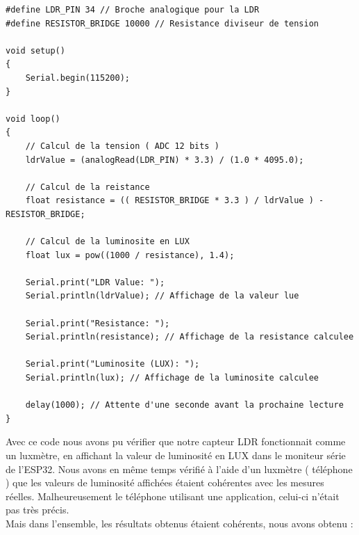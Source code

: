 \begin{lstlisting}[style=CStyle, caption={Exemple utilisation LDR}, label={lst:ldr_exemple}]
#define LDR_PIN 34 // Broche analogique pour la LDR
#define RESISTOR_BRIDGE 10000 // Resistance diviseur de tension 

void setup() 
{
    Serial.begin(115200); 
}

void loop() 
{
    // Calcul de la tension ( ADC 12 bits )
    ldrValue = (analogRead(LDR_PIN) * 3.3) / (1.0 * 4095.0);

    // Calcul de la reistance 
    float resistance = (( RESISTOR_BRIDGE * 3.3 ) / ldrValue ) - RESISTOR_BRIDGE;
    
    // Calcul de la luminosite en LUX
    float lux = pow((1000 / resistance), 1.4); 

    Serial.print("LDR Value: ");
    Serial.println(ldrValue); // Affichage de la valeur lue
    
    Serial.print("Resistance: ");
    Serial.println(resistance); // Affichage de la resistance calculee
    
    Serial.print("Luminosite (LUX): ");
    Serial.println(lux); // Affichage de la luminosite calculee

    delay(1000); // Attente d'une seconde avant la prochaine lecture
}
\end{lstlisting}

Avec ce code nous avons pu vérifier que notre capteur LDR fonctionnait comme un luxmètre,
en affichant la valeur de luminosité en LUX dans le moniteur série de l'ESP32. 
Nous avons en même temps vérifié à l'aide d'un luxmètre ( téléphone ) que les valeurs de 
luminosité affichées étaient cohérentes avec les mesures réelles. Malheureusement le téléphone 
utilisant une application, celui-ci n'était pas très précis.
\\

Mais dans l'ensemble, les résultats obtenus étaient cohérents, nous avons obtenu : 
\\

